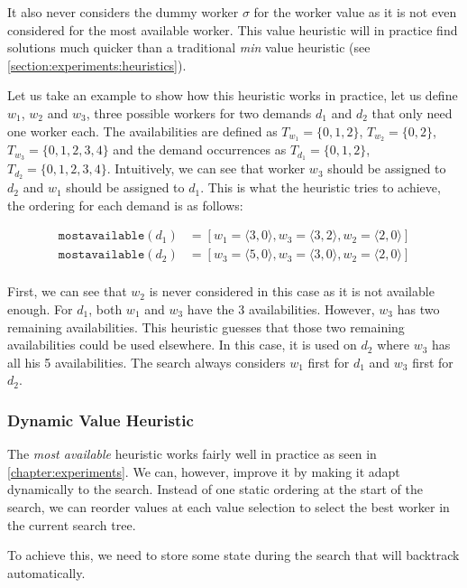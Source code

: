 \documentclass[../../thesis.tex]{subfiles}
\begin{document}
It also never considers the dummy worker $\sigma$ for the worker value as it is not even considered 
for the most available worker. This value heuristic will in practice find solutions much quicker than a traditional \emph{min} value heuristic 
(see \autoref{section:experiments:heuristics}).

Let us take an example to show how this heuristic works in practice, let us define 
$w_1$, $w_2$ and $w_3$, three possible workers for two demands $d_1$ and $d_2$ that only need one worker each.
The availabilities are defined as
$T_{w_1} = \{ 0, 1, 2 \}$, $T_{w_2} = \{ 0, 2 \}$, $T_{w_3} = \{ 0, 1, 2, 3, 4\}$ and the demand occurrences as 
$T_{d_1} = \{ 0, 1, 2 \}$, $T_{d_2} = \{ 0, 1, 2, 3, 4 \}$. Intuitively, we can see that worker 
$w_3$ should be assigned to $d_2$ and $w_1$ should be assigned to $d_1$. This is what the heuristic tries to achieve, the ordering for each demand is as follows:

\begin{align*}
  \texttt{mostavailable}(d_1) &= [w_1 = \langle3, 0\rangle, w_3 = \langle3, 2\rangle, w_2 = \langle2, 0\rangle] \\ 
  \texttt{mostavailable}(d_2) &= [w_3 = \langle5, 0\rangle, w_3 = \langle3, 0\rangle, w_2 = \langle2, 0\rangle] \\ 
\end{align*}

First, we can see that $w_2$ is never considered in this case as it is not available enough. For $d_1$, both $w_1$ and $w_3$ have the 3 availabilities. However, 
$w_3$ has two remaining availabilities. This heuristic guesses that those two remaining availabilities could be used elsewhere. In this case, it is used on $d_2$ where $w_3$ has all his 5 availabilities.
The search always considers $w_1$ first for $d_1$ and $w_3$ first for $d_2$.

\subsubsection{Dynamic Value Heuristic}

The \emph{most available} heuristic works fairly well in practice as seen in \autoref{chapter:experiments}. 
We can, however, improve it by making it adapt dynamically to the search. Instead of one static ordering at the start of the search,
we can reorder values at each value selection to select the best worker in the current search tree.

To achieve this, we need to store some state during the search that will backtrack automatically.
\end{document}
